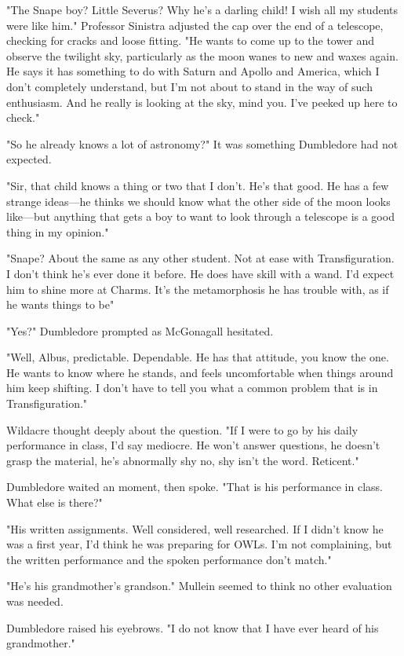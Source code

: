 "The Snape boy? Little Severus? Why he's a darling child! I wish all my students were like him." Professor Sinistra adjusted the cap over the end of a telescope, checking for cracks and loose fitting. "He wants to come up to the tower and observe the twilight sky, particularly as the moon wanes to new and waxes again. He says it has something to do with Saturn and Apollo and America, which I don't completely understand, but I'm not about to stand in the way of such enthusiasm. And he really is looking at the sky, mind you. I've peeked up here to check."

"So he already knows a lot of astronomy?" It was something Dumbledore had not expected.

"Sir, that child knows a thing or two that I don't. He's that good. He has a few strange ideas—he thinks we should know what the other side of the moon looks like—but anything that gets a boy to want to look through a telescope is a good thing in my opinion."

"Snape? About the same as any other student. Not at ease with Transfiguration. I don't think he's ever done it before. He does have skill with a wand. I'd expect him to shine more at Charms. It's the metamorphosis he has trouble with, as if he wants things to be{\el}"

"Yes?" Dumbledore prompted as McGonagall hesitated.

"Well, Albus, predictable. Dependable. He has that attitude, you know the one. He wants to know where he stands, and feels uncomfortable when things around him keep shifting. I don't have to tell you what a common problem that is in Transfiguration."

Wildacre thought deeply about the question. "If I were to go by his daily performance in class, I'd say mediocre. He won't answer questions, he doesn't grasp the material, he's abnormally shy{\el} no, shy isn't the word. Reticent."

Dumbledore waited an moment, then spoke. "That is his performance in class. What else is there?"

"His written assignments. Well considered, well researched. If I didn't know he was a first year, I'd think he was preparing for OWLs. I'm not complaining, but the written performance and the spoken performance don't match."

"He's his grandmother's grandson." Mullein seemed to think no other evaluation was needed.

Dumbledore raised his eyebrows. "I do not know that I have ever heard of his grandmother."

